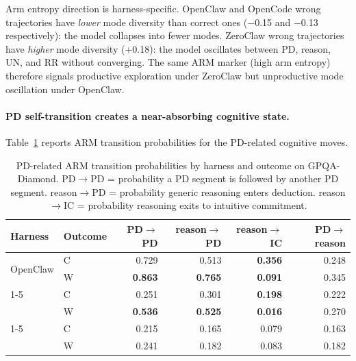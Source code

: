 Arm entropy direction is harness-specific.
OpenClaw and OpenCode wrong trajectories have \emph{lower} mode diversity than
correct ones ($-$0.15 and $-$0.13 respectively): the model collapses into fewer
modes.
ZeroClaw wrong trajectories have \emph{higher} mode diversity (+0.18): the model
oscillates between PD, reason, UN, and RR without converging.
The same ARM marker (high arm entropy) therefore signals productive exploration
under ZeroClaw but unproductive mode oscillation under OpenClaw.

\paragraph{PD self-transition creates a near-absorbing cognitive state.}

Table~\ref{tab:gpqa-pd-transitions} reports ARM transition probabilities
for the PD-related cognitive moves.

\begin{table}[t]
\centering
\small
\caption{%
  PD-related ARM transition probabilities by harness and outcome on
  GPQA-Diamond.
  PD$\to$PD = probability a PD segment is followed by another PD segment.
  reason$\to$PD = probability generic reasoning enters deduction.
  reason$\to$IC = probability reasoning exits to intuitive commitment.
}
\label{tab:gpqa-pd-transitions}
\setlength{\tabcolsep}{4pt}
\begin{tabular}{llrrrr}
\toprule
Harness & Outcome & PD$\to$PD & reason$\to$PD & reason$\to$IC & PD$\to$reason \\
\midrule
\multirow{2}{*}{OpenClaw}
  & C & 0.729 & 0.513 & \textbf{0.356} & 0.248 \\
  & W & \textbf{0.863} & \textbf{0.765} & \textbf{0.091} & 0.345 \\
\cmidrule{1-5}
\multirow{2}{*}{OpenCode}
  & C & 0.251 & 0.301 & \textbf{0.198} & 0.222 \\
  & W & \textbf{0.536} & \textbf{0.525} & \textbf{0.016} & 0.270 \\
\cmidrule{1-5}
\multirow{2}{*}{ZeroClaw}
  & C & 0.215 & 0.165 & 0.079 & 0.163 \\
  & W & 0.241 & 0.182 & 0.083 & 0.182 \\
\bottomrule
\end{tabular}
\end{table}


